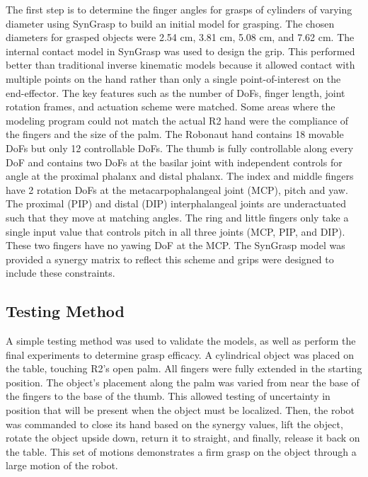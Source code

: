 \documentclass[runningheads,a4paper]{llncs}
\begin{document}
The first step is to determine the finger angles for grasps of cylinders of varying diameter using SynGrasp to build an initial model for grasping.  The chosen diameters for grasped objects were 2.54 cm, 3.81 cm, 5.08 cm, and 7.62 cm.  The internal contact model in SynGrasp was used to design the grip.  This performed better than traditional inverse kinematic models because it allowed contact with multiple points on the hand rather than only a single point-of-interest on the end-effector.  The key features such as the number of DoFs, finger length, joint rotation frames, and actuation scheme were matched.  Some areas where the modeling program could not match the actual R2 hand were the compliance of the fingers and the size of the palm.  The Robonaut hand contains 18 movable DoFs but only 12 controllable DoFs.  The thumb is fully controllable along every DoF and contains two DoFs at the basilar joint with independent controls for angle at the proximal phalanx and distal phalanx.  The index and middle fingers have 2 rotation DoFs at the metacarpophalangeal joint (MCP), pitch and yaw.  The proximal (PIP) and distal (DIP) interphalangeal joints are underactuated such that they move at matching angles.  The ring and little fingers only take a single input value that controls pitch in all three joints (MCP, PIP, and DIP).  These two fingers have no yawing DoF at the MCP.  The SynGrasp model was provided a synergy matrix to reflect this scheme and grips were designed to include these constraints. 


\subsection{Testing Method} 
A simple testing method was used to validate the models, as well as perform the final experiments to determine grasp efficacy. A cylindrical object was placed on the table, touching R2's open palm. All fingers were fully extended in the starting position.  The object's placement along the palm was varied from near the base of the fingers to the base of the thumb. This allowed testing of uncertainty in position that will be present when the object must be localized. Then, the robot was commanded to close its hand based on the synergy values, lift the object, rotate the object upside down, return it to straight, and finally, release it back on the table. This set of motions demonstrates a firm grasp on the object through a large motion of the robot. 
\end{document}
